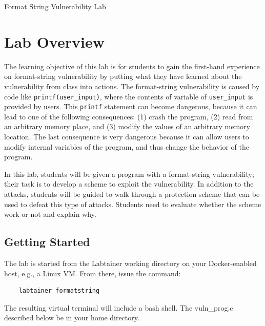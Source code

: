 







\begin{center}
{\LARGE Format String Vulnerability Lab}
\end{center}

\copyrightnotice


\section{Lab Overview}

The learning objective of this lab is for students to gain the first-hand
experience on format-string vulnerability by putting what they have learned 
about the vulnerability from class into actions.
The format-string vulnerability is caused by code like 
{\tt printf(user\_input)}, where the contents of variable
of {\tt user\_input} is provided by users. 
This {\tt printf}
statement can become dangerous, because it can lead to one of the following
consequences: (1) crash the 
program, (2) read from an arbitrary memory place, and (3) modify
the values of an arbitrary memory location. The last consequence
is very dangerous because it can allow users to modify internal
variables of the program, and thus change the behavior
of the program.  


In this lab, students will be given a program with a format-string
vulnerability; their task is to develop a scheme to exploit
the vulnerability.  In addition to the
attacks, students will be guided to walk through a protection
scheme that can be used to defeat this type of attacks. 
Students need to evaluate
whether the scheme work or not and explain why.


\subsection{Getting Started}
The lab is started from the Labtainer working 
directory on your Docker-enabled host, e.g., a Linux VM.
From there, issue the command:
\begin{verbatim}
    labtainer formatstring
\end{verbatim}

The resulting virtual terminal will include 
a bash shell.  The vuln\_prog.c 
described below be in your home directory.

